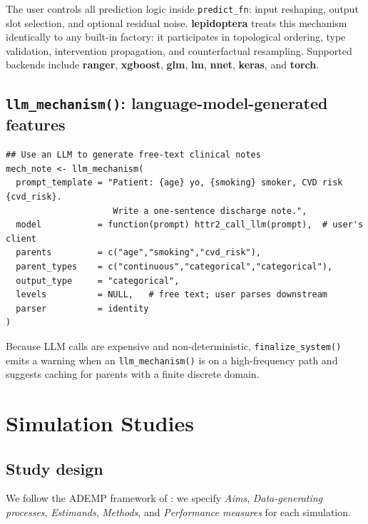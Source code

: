 \documentclass[12pt,a4paper]{article}
\newcommand{\pkg}[1]{\textbf{#1}}
\newcommand{\code}[1]{\texttt{#1}}
\newcommand{\fct}[1]{\mbox{\texttt{#1()}}}
\begin{document}
The user controls all prediction logic inside \code{predict\_fn}: input
reshaping, output slot selection, and optional residual noise. \pkg{lepidoptera}
treats this mechanism identically to any built-in factory: it participates in
topological ordering, type validation, intervention propagation, and counterfactual
resampling. Supported backends include \pkg{ranger}, \pkg{xgboost}, \pkg{glm},
\pkg{lm}, \pkg{nnet}, \pkg{keras}, and \pkg{torch}.

\subsection{\fct{llm\_mechanism}: language-model-generated features}
\label{sec:llm}

\begin{tcolorbox}[codebox, title={\small\textbf{R} code}]
\begin{verbatim}
## Use an LLM to generate free-text clinical notes
mech_note <- llm_mechanism(
  prompt_template = "Patient: {age} yo, {smoking} smoker, CVD risk {cvd_risk}.
                     Write a one-sentence discharge note.",
  model           = function(prompt) httr2_call_llm(prompt),  # user's client
  parents         = c("age","smoking","cvd_risk"),
  parent_types    = c("continuous","categorical","categorical"),
  output_type     = "categorical",
  levels          = NULL,   # free text; user parses downstream
  parser          = identity
)
\end{verbatim}
\end{tcolorbox}

Because LLM calls are expensive and non-deterministic, \fct{finalize\_system}
emits a warning when an \fct{llm\_mechanism} is on a high-frequency path and
suggests caching for parents with a finite discrete domain.

\section{Simulation Studies}
\label{sec:sims}

\subsection{Study design}
\label{sec:sim_design}

We follow the ADEMP framework of \citet{morris2019using}: we specify
\emph{Aims}, \emph{Data-generating processes}, \emph{Estimands},
\emph{Methods}, and \emph{Performance measures} for each simulation.
\end{document}
